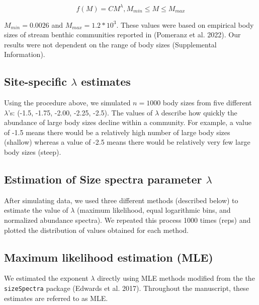 \documentclass[
]{article}
\begin{document}
\[f(M) = CM^\lambda, M_{min} \le M \le M_{max}\]

\(M_{min} = 0.0026\) and \(M_{max} = 1.2 *10^3\). These values were
based on empirical body sizes of stream benthic communities reported in
(Pomeranz et al. 2022). Our results were not dependent on the range of
body sizes (Supplemental Information).

\hypertarget{site-specific-lambda-estimates}{%
\subsection{\texorpdfstring{Site-specific \(\lambda\)
estimates}{Site-specific \textbackslash lambda estimates}}\label{site-specific-lambda-estimates}}

Using the procedure above, we simulated \(n = 1000\) body sizes from
five different \(\lambda\)'s: (-1.5, -1.75, -2.00, -2.25, -2.5). The
values of \(\lambda\) describe how quickly the abundance of large body
sizes decline within a community. For example, a value of -1.5 means
there would be a relatively high number of large body sizes (shallow)
whereas a value of -2.5 means there would be relatively very few large
body sizes (steep).

\hypertarget{estimation-of-size-spectra-parameter-lambda}{%
\subsection{\texorpdfstring{Estimation of Size spectra parameter
\(\lambda\)}{Estimation of Size spectra parameter \textbackslash lambda}}\label{estimation-of-size-spectra-parameter-lambda}}

After simulating data, we used three different methods (described below)
to estimate the value of \(\lambda\) (maximum likelihood, equal
logarithmic bins, and normalized abundance spectra). We repeated this
process 1000 times (reps) and plotted the distribution of values
obtained for each method.

\hypertarget{maximum-likelihood-estimation-mle}{%
\subsection{Maximum likelihood estimation
(MLE)}\label{maximum-likelihood-estimation-mle}}

We estimated the exponent \(\lambda\) directly using MLE methods
modified from the the \texttt{sizeSpectra} package (Edwards et al.
2017). Throughout the manuscript, these estimates are referred to as
MLE.
\end{document}
